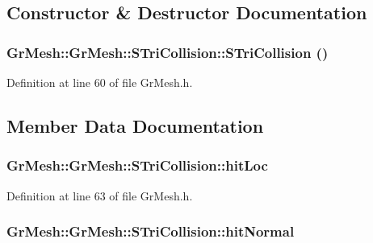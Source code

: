 \subsection{Constructor \& Destructor Documentation}
\hypertarget{struct_gr_mesh_1_1_s_tri_collision_8adcba53611348585a54dd2227cb0dd1}{
\subsubsection[{STriCollision}]{\setlength{\rightskip}{0pt plus 5cm}GrMesh::GrMesh::STriCollision::STriCollision ()}}
\label{struct_gr_mesh_1_1_s_tri_collision_8adcba53611348585a54dd2227cb0dd1}




Definition at line 60 of file GrMesh.h.

\subsection{Member Data Documentation}
\hypertarget{struct_gr_mesh_1_1_s_tri_collision_3a4997da126ca2145ef6974ba9f4b6c2}{
\subsubsection[{hitLoc}]{ GrMesh::GrMesh::STriCollision::hitLoc}}
\label{struct_gr_mesh_1_1_s_tri_collision_3a4997da126ca2145ef6974ba9f4b6c2}




Definition at line 63 of file GrMesh.h.\hypertarget{struct_gr_mesh_1_1_s_tri_collision_c0ef99ec1c7b6f52176ac1538e98195a}{
\subsubsection[{hitNormal}]{ GrMesh::GrMesh::STriCollision::hitNormal}}
\label{struct_gr_mesh_1_1_s_tri_collision_c0ef99ec1c7b6f52176ac1538e98195a}




